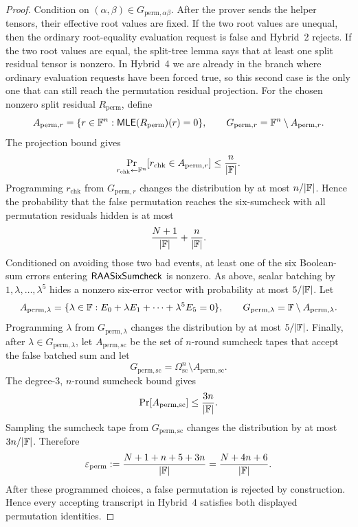 \begin{proof}
Condition on \((\alpha,\beta)\in G_{\mathrm{perm},\alpha\beta}\).  After the
prover sends the helper tensors, their effective root values are fixed.  If the
two root values are unequal, then the ordinary root-equality evaluation request
is false and Hybrid~2 rejects.  If the two root values are equal, the
split-tree lemma says that at least one split residual tensor is nonzero.  In
Hybrid~4 we are already in the branch where ordinary evaluation requests have
been forced true, so this second case is the only one that can still reach the
permutation residual projection.  For the chosen nonzero split residual
\(R_{\mathrm{perm}}\), define
\[
  A_{\mathrm{perm},r}
  =
  \{r\in\mathbb{F}^n:\mathsf{MLE}(R_{\mathrm{perm}})(r)=0\},
  \qquad
  G_{\mathrm{perm},r}
  =
  \mathbb{F}^n\setminus A_{\mathrm{perm},r}.
\]
The projection bound gives
\[
  \Pr_{r_{\mathrm{chk}}\leftarrow\mathbb{F}^n}
    [r_{\mathrm{chk}}\in A_{\mathrm{perm},r}]
  \le
  \frac{n}{|\mathbb{F}|}.
\]
Programming \(r_{\mathrm{chk}}\) from \(G_{\mathrm{perm},r}\) changes the
distribution by at most \(n/|\mathbb{F}|\).  Hence the probability that the false
permutation reaches the six-sumcheck with all permutation residuals hidden is
at most
\[
  \frac{N+1}{|\mathbb{F}|}+\frac{n}{|\mathbb{F}|}.
\]
Conditioned on avoiding those two bad events, at least one of the six
Boolean-sum errors entering \(\mathsf{RAASixSumcheck}\) is nonzero.  As above, scalar
batching by \(1,\lambda,\ldots,\lambda^5\) hides a nonzero six-error vector
with probability at most \(5/|\mathbb{F}|\).  Let
\[
  A_{\mathrm{perm},\lambda}
  =
  \{\lambda\in\mathbb{F}:
    E_0+\lambda E_1+\cdots+\lambda^5E_5=0\},
  \qquad
  G_{\mathrm{perm},\lambda}
  =
  \mathbb{F}\setminus A_{\mathrm{perm},\lambda}.
\]
Programming \(\lambda\) from \(G_{\mathrm{perm},\lambda}\) changes the
distribution by at most \(5/|\mathbb{F}|\).  Finally, after
\(\lambda\in G_{\mathrm{perm},\lambda}\), let
\(A_{\mathrm{perm},\mathrm{sc}}\) be the set of \(n\)-round sumcheck tapes that
accept the false batched sum and let
\[
  G_{\mathrm{perm},\mathrm{sc}}
  =
  \Omega_{\mathrm{sc}}^n\setminus A_{\mathrm{perm},\mathrm{sc}}.
\]
The degree-\(3\), \(n\)-round sumcheck bound gives
\[
  \Pr[A_{\mathrm{perm},\mathrm{sc}}]\le \frac{3n}{|\mathbb{F}|}.
\]
Sampling the sumcheck tape from \(G_{\mathrm{perm},\mathrm{sc}}\) changes the
distribution by at most \(3n/|\mathbb{F}|\).
Therefore
\[
  \varepsilon_{\mathrm{perm}}
  :=
  \frac{N+1+n+5+3n}{|\mathbb{F}|}
  =
  \frac{N+4n+6}{|\mathbb{F}|}.
\]
After these programmed choices, a false permutation is rejected by
construction.  Hence every accepting transcript in Hybrid~4 satisfies both
displayed permutation identities.


\end{proof}

